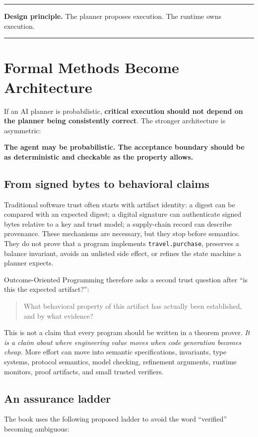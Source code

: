 \documentclass[10pt,oneside,openany]{book}
\newcommand{\principle}[1]{%
  \vspace{4pt}
  \noindent\begin{minipage}{\linewidth}
  \hrule\vspace{5pt}
  \small\sffamily\raggedright\textbf{Design principle.} #1
  \vspace{5pt}\hrule
  \end{minipage}\vspace{4pt}
}
\newcommand{\mono}[1]{\texttt{#1}}
\begin{document}
\principle{The planner proposes execution. The runtime owns execution.}


\chapter{Formal Methods Become Architecture}\label{ch:formal}

If an AI planner is probabilistic, \textbf{critical execution should not depend on the planner being consistently correct}. The stronger architecture is asymmetric:

\begin{center}
\sffamily\bfseries
The agent may be probabilistic. The acceptance boundary should be as deterministic and checkable as the property allows.
\end{center}

\section{From signed bytes to behavioral claims}
Traditional software trust often starts with artifact identity: a digest can be compared with an expected digest; a digital signature can authenticate signed bytes relative to a key and trust model; a supply-chain record can describe provenance. These mechanisms are necessary, but they stop before semantics. They do not prove that a program implements \mono{travel.purchase}, preserves a balance invariant, avoids an unlisted side effect, or refines the state machine a planner expects.

Outcome-Oriented Programming therefore asks a second trust question after ``is this the expected artifact?'':

\begin{quote}
What behavioral property of this artifact has actually been established, and by what evidence?
\end{quote}

This is not a claim that every program should be written in a theorem prover. \emph{It is a claim about where engineering value moves when code generation becomes cheap.} More effort can move into semantic specifications, invariants, type systems, protocol semantics, model checking, refinement arguments, runtime monitors, proof artifacts, and small trusted verifiers.

\section{An assurance ladder}
The book uses the following proposed ladder to avoid the word ``verified'' becoming ambiguous:
\end{document}
